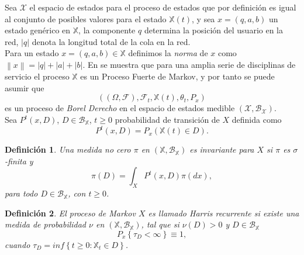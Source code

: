\documentclass{article}
\newtheorem{Def}{Definición}
\begin{document}
Sea $\mathcal{X}$ el espacio de estados para el proceso de estados que por definici\'on es igual  al conjunto de posibles valores para el estado $\mathbb{X}\left(t\right)$, y sea $x=\left(q,a,b\right)$ un estado gen\'erico en $\mathbb{X}$, la componente $q$ determina la posici\'on del usuario en la red, $|q|$ denota la longitud total de la cola en la red.\\

Para un estado $x=\left(q,a,b\right)\in\mathbb{X}$ definimos la {\em norma} de $x$ como $\left\|x\right\|=|q|+|a|+|b|$. En \cite{Dai} se muestra que para una amplia serie de disciplinas de servicio el proceso $\mathbb{X}$ es un Proceso Fuerte de Markov, y por tanto se puede asumir que \[\left(\left(\Omega,\mathcal{F}\right),\mathcal{F}_{t},\mathbb{X}\left(t\right),\theta_{t},P_{x}\right)\] es un proceso de {\em Borel Derecho} en el espacio de estados medible $\left(\mathcal{X},\mathcal{B}_{\mathcal{X}}\right)$.\\

Sea $P^{t}\left(x,D\right)$, $D\in\mathcal{B}_{\mathbb{X}}$, $t\geq0$ probabilidad de transici\'on de $X$ definida como \[P^{t}\left(x,D\right)=P_{x}\left(\mathbb{X}\left(t\right)\in D\right).\]

\begin{Def}
Una medida no cero $\pi$ en $\left(\mathbb{X},\mathcal{B}_{\mathbb{X}}\right)$ es {\em invariante} para $X$ si $\pi$ es $\sigma$-finita y
\[\pi\left(D\right)=\int_{X}P^{t}\left(x,D\right)\pi\left(dx\right),\] para todo $D\in \mathcal{B}_{\mathbb{X}}$, con $t\geq0$.
\end{Def}

\begin{Def}
El proceso de Markov $X$ es llamado {\em Harris recurrente} si existe una medida de probabilidad $\nu$ en $\left(\mathbb{X},\mathcal{B}_{\mathbb{X}}\right)$, tal que si $\nu\left(D\right)>0$ y $D\in\mathcal{B}_{\mathbb{X}}$ \[P_{x}\left\{\tau_{D}<\infty\right\}\equiv1,\] cuando $\tau_{D}=inf\left\{t\geq0:\mathbb{X}_{t}\in D\right\}$.
\end{Def}
\end{document}
